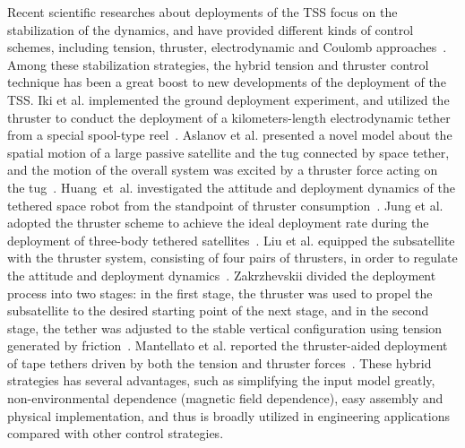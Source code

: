 \documentclass[3p]{elsarticle}
\theoremstyle{plain}
\theoremstyle{remark}
\begin{document}
Recent scientific researches about deployments of the TSS focus on the stabilization of the dynamics, and have provided different kinds of control schemes, including tension, thruster, electrodynamic and Coulomb approaches~\cite{zhu2008,kojima2015stabilisation,qi2016dynamics,zhong2016research,sun2013}. Among these stabilization strategies, the hybrid tension and thruster control technique has been a great boost to new developments of the deployment of the TSS. Iki et al. implemented the ground deployment experiment, and utilized the thruster to conduct the deployment of a kilometers-length electrodynamic tether from a special spool-type reel~\cite{iki2014experiments}. Aslanov et al. presented a novel model about the spatial motion of a large passive satellite and the tug connected by space tether, and the motion of the overall system was excited by a thruster force acting on the tug~\cite{aslanov2013dynamics}. Huang~et~al. investigated the attitude and deployment dynamics of the tethered space robot from the standpoint of thruster consumption~\cite{huang2015coupling}. Jung et al. adopted the thruster scheme to achieve the ideal deployment rate during the deployment of three-body tethered satellites~\cite{jung2015nonlinear}. Liu et al. equipped the subsatellite with the thruster system, consisting of four pairs of thrusters, in order to regulate the attitude and deployment dynamics~\cite{liu2014attitude}. Zakrzhevskii divided the deployment process into two stages: in the first stage, the thruster was used to propel the subsatellite to the desired starting point of the next stage, and in the second stage, the tether was adjusted to the stable vertical configuration using tension generated by friction~\cite{zakrzhevskii2016method}. Mantellato et al. reported the thruster-aided deployment of tape tethers driven by both the tension and thruster forces~\cite{mantellato2015thrust}. These hybrid strategies has several advantages, such as simplifying the input model greatly, non-environmental dependence (magnetic field dependence), easy assembly and physical implementation, and thus is broadly utilized in engineering applications compared with other control strategies.
\end{document}
